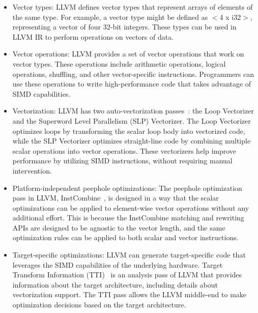 \begin{itemize}

\item Vector types: LLVM defines vector types that represent arrays of
  elements of the same type. For example, a vector type might be
  defined as $<$4 x i32$>$, representing a vector of four 32-bit integers.
  These types can be used in LLVM IR to perform operations on vectors
  of data.

\item Vector operations: LLVM provides a set of vector operations that
  work on vector types. These operations include arithmetic operations,
  logical operations, shuffling, and other vector-specific
  instructions. Programmers can use these operations to write
  high-performance code that takes advantage of SIMD capabilities.

\item Vectorization: LLVM has two auto-vectorization
  passes~\cite{llvmvectorizers}: the Loop Vectorizer and the Superword
  Level Parallelism (SLP) Vectorizer.
  The Loop Vectorizer optimizes loops by transforming the scalar loop body
  into vectorized code, while the SLP Vectorizer optimizes
  straight-line code by combining multiple scalar operations into
  vector operations.
  These vectorizers help improve performance by utilizing SIMD
  instructions, without requiring manual intervention.

\item Platform-independent peephole optimizations: The peephole
  optimization pass in LLVM, InstCombine~\cite{InstCombine}, is designed in a way that
  the scalar optimizations can be applied to element-wise vector
  operations without any additional effort.
  This is because the InstCombine matching and rewriting APIs are
  designed to be agnostic to the vector length, and the same
  optimization rules can be applied to both scalar and vector
  instructions.

\item Target-specific optimizations: LLVM can generate target-specific
  code that leverages the SIMD capabilities of the underlying
  hardware.
  Target Transform Information (TTI)~\cite{tti} is an analysis pass of
  LLVM that provides information about the target architecture,
  including details about vectorization support.
  The TTI pass allows the LLVM middle-end to make optimization decisions
  based on the target architecture.


\end{itemize}

